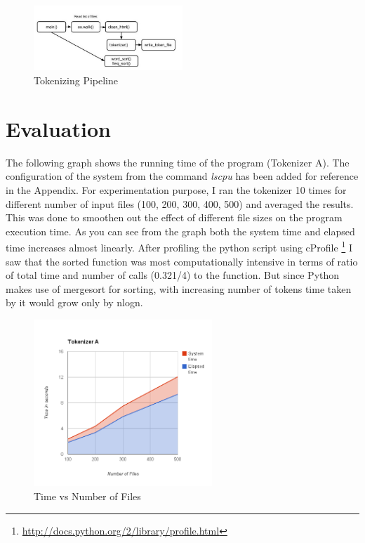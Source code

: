 \documentclass[11pt]{article} %
\begin{document}
\begin{figure}[h]
  \begin{center}
    \includegraphics[width=0.5\textwidth]{module.jpg}
  \end{center}
  \caption{Tokenizing Pipeline}
\end{figure}


\section{Evaluation} %

The following graph shows the running time of the program (Tokenizer A). The configuration of the system from the command \textit{lscpu} has been added for reference in the Appendix. For experimentation purpose, I ran the tokenizer 10 times for different number of input files (100, 200, 300, 400, 500) and averaged the results. This was done to smoothen out the effect of different file sizes on the program execution time. As you can see from the graph both the system time and elapsed time increases almost linearly. After profiling the python script using cProfile \footnote{\url{http://docs.python.org/2/library/profile.html}} I saw that the sorted function was most computationally intensive in terms of ratio of total time and number of calls (0.321/4) to the function. But since Python makes use of mergesort for sorting, with increasing number of tokens time taken by it would grow only by nlogn.   

\begin{figure}[h] %
  \begin{center}
    \includegraphics[width=0.6\textwidth]{tokenizerA.png}
  \end{center}
  \caption{Time vs Number of Files}
\end{figure}
\end{document}
